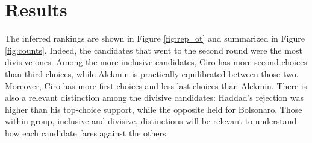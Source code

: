 \documentclass[hidelinks,11pt]{article}
\begin{document}
\section{Results}
The inferred rankings are shown in Figure \ref{fig:rep_ot} and summarized in
Figure \ref{fig:counts}. Indeed, the candidates that went to the second round
were the most divisive ones. Among the more inclusive candidates, Ciro has more
second choices than third choices, while Alckmin is practically equilibrated
between those two. Moreover, Ciro has more first choices and less last choices
than Alckmin. There is also a relevant distinction among the divisive
candidates: Haddad's rejection was higher than his top-choice support, while the
opposite held for Bolsonaro. Those within-group, inclusive and divisive,
distinctions will be relevant to understand how each candidate fares against the
others.
\end{document}
